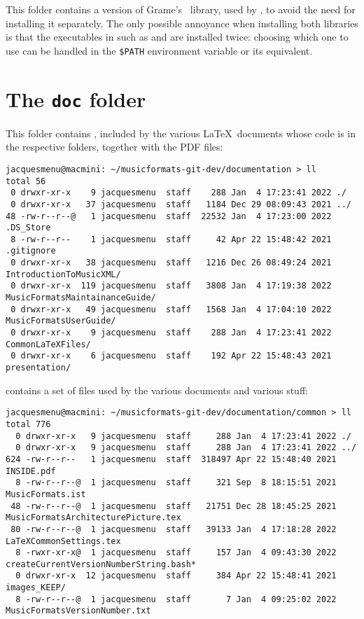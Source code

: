 This folder contains a version of Grame's \libmusicxml\ library, used by \mf, to avoid the need for installing it separately. The only possible annoyance when installing both libraries is that the executables in  such as  and  are installed twice: choosing which one to use can be handled in the {\tt \$\textbraceleft PATH\textbraceright} environment variable or its equivalent.


\section{The {\tt doc} folder}

This folder contains , included by the various \LaTeX\ documents whose code is in the respective folders, together with the PDF files:
\begin{lstlisting}[language=Terminal]
jacquesmenu@macmini: ~/musicformats-git-dev/documentation > ll
total 56
 0 drwxr-xr-x    9 jacquesmenu  staff    288 Jan  4 17:23:41 2022 ./
 0 drwxr-xr-x   37 jacquesmenu  staff   1184 Dec 29 08:09:43 2021 ../
48 -rw-r--r--@   1 jacquesmenu  staff  22532 Jan  4 17:23:00 2022 .DS_Store
 8 -rw-r--r--    1 jacquesmenu  staff     42 Apr 22 15:48:42 2021 .gitignore
 0 drwxr-xr-x   38 jacquesmenu  staff   1216 Dec 26 08:49:24 2021 IntroductionToMusicXML/
 0 drwxr-xr-x  119 jacquesmenu  staff   3808 Jan  4 17:19:38 2022 MusicFormatsMaintainanceGuide/
 0 drwxr-xr-x   49 jacquesmenu  staff   1568 Jan  4 17:04:10 2022 MusicFormatsUserGuide/
 0 drwxr-xr-x    9 jacquesmenu  staff    288 Jan  4 17:23:41 2022 CommonLaTeXFiles/
 0 drwxr-xr-x    6 jacquesmenu  staff    192 Apr 22 15:48:43 2021 presentation/
\end{lstlisting}

 contains a set of files used by the various documents and various stuff:
\begin{lstlisting}[language=Terminal]
jacquesmenu@macmini: ~/musicformats-git-dev/documentation/common > ll
total 776
  0 drwxr-xr-x   9 jacquesmenu  staff     288 Jan  4 17:23:41 2022 ./
  0 drwxr-xr-x   9 jacquesmenu  staff     288 Jan  4 17:23:41 2022 ../
624 -rw-r--r--   1 jacquesmenu  staff  318497 Apr 22 15:48:40 2021 INSIDE.pdf
  8 -rw-r--r--@  1 jacquesmenu  staff     321 Sep  8 18:15:51 2021 MusicFormats.ist
 48 -rw-r--r--@  1 jacquesmenu  staff   21751 Dec 28 18:45:25 2021 MusicFormatsArchitecturePicture.tex
 80 -rw-r--r--@  1 jacquesmenu  staff   39133 Jan  4 17:18:28 2022 LaTeXCommonSettings.tex
  8 -rwxr-xr-x@  1 jacquesmenu  staff     157 Jan  4 09:43:30 2022 createCurrentVersionNumberString.bash*
  0 drwxr-xr-x  12 jacquesmenu  staff     384 Apr 22 15:48:41 2021 images_KEEP/
  8 -rw-r--r--@  1 jacquesmenu  staff       7 Jan  4 09:25:02 2022 MusicFormatsVersionNumber.txt
\end{lstlisting}

